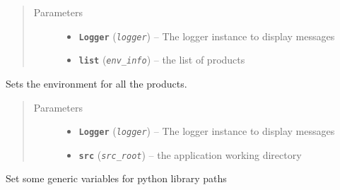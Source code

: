 \documentclass[a4paper,10pt,english]{sphinxmanual}
\begin{document}
\begin{fulllineitems}
\begin{fulllineitems}
\begin{description}
\end{description}
\begin{quote}\begin{description}
\item[{Parameters}] \leavevmode\begin{itemize}
\item {} 
\textbf{\texttt{Logger}} (\emph{\texttt{logger}}) -- The logger instance to display messages

\item {} 
\textbf{\texttt{list}} (\emph{\texttt{env\_info}}) -- the list of products

\end{itemize}

\end{description}\end{quote}

\end{fulllineitems}


\begin{fulllineitems}
\label{commands/apidoc/src:src.environment.SalomeEnviron.set_products}
Sets the environment for all the products.
\begin{quote}\begin{description}
\item[{Parameters}] \leavevmode\begin{itemize}
\item {} 
\textbf{\texttt{Logger}} (\emph{\texttt{logger}}) -- The logger instance to display messages

\item {} 
\textbf{\texttt{src}} (\emph{\texttt{src\_root}}) -- the application working directory

\end{itemize}

\end{description}\end{quote}

\end{fulllineitems}


\begin{fulllineitems}
\label{commands/apidoc/src:src.environment.SalomeEnviron.set_python_libdirs}
Set some generic variables for python library paths


\end{fulllineitems}
\end{fulllineitems}
\end{document}
